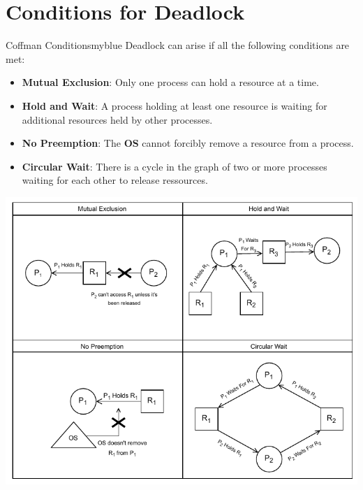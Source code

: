 \vspace{0.25cm}
\null
\section{Conditions for Deadlock}
\begin{prettyBox}{Coffman Conditions}{myblue}
Deadlock can arise if all the following conditions are met:
\begin{itemize}
    \item \textbf{Mutual Exclusion}: Only one process can hold a resource at a time.
    \item \textbf{Hold and Wait}: A process holding at least one resource is waiting for additional resources held by other processes.
    \item \textbf{No Preemption}: The \textbf{OS} cannot forcibly remove a resource from a process.
    \item \textbf{Circular Wait}: There is a cycle in the graph of two or more processes waiting for each other to release ressources.
\end{itemize}
\end{prettyBox}

\vspace{1cm}

\begin{center}
    \includegraphics{Chapters/Diagram/Deadlock/coffman.drawio.pdf}
\end{center}

\newpage
\null
